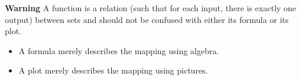 \documentclass{ximera}
\theoremstyle{definition}
\begin{document}
\textbf{Warning} A function is a relation (such that for each input, there is exactly one output) between sets and should not be confused with either its formula or its plot.
\begin{itemize}
	\item A formula merely describes the mapping using algebra.
	\item A plot merely describes the mapping using pictures.
\end{itemize}
\end{document}
